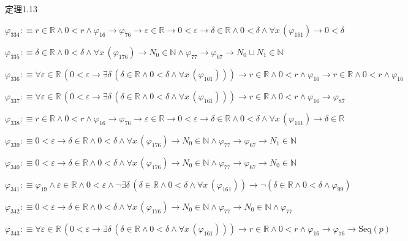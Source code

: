 \begin{fullproof}{定理1.13}
\begin{abbrevlist}
\item $\varphi_{334} :\equiv r \in \mathbb{R} \land 0 < r \land \varphi_{16} \to \varphi_{76} \to \varepsilon \in \mathbb{R} \to 0 < \varepsilon \to \delta \in \mathbb{R} \land 0 < \delta \land \forall x\,(\varphi_{161}) \to 0 < \delta$
\item $\varphi_{335} :\equiv \delta \in \mathbb{R} \land 0 < \delta \land \forall x\,(\varphi_{176}) \to N_{0} \in \mathbb{N} \land \varphi_{77} \to \varphi_{67} \to N_{0} \cup N_{1} \in \mathbb{N}$
\item $\varphi_{336} :\equiv \forall \varepsilon \in \mathbb{R}\,(0 < \varepsilon \to \exists \delta\,(\delta \in \mathbb{R} \land 0 < \delta \land \forall x\,(\varphi_{161}))) \to r \in \mathbb{R} \land 0 < r \land \varphi_{16} \to r \in \mathbb{R} \land 0 < r \land \varphi_{16}$
\item $\varphi_{337} :\equiv \forall \varepsilon \in \mathbb{R}\,(0 < \varepsilon \to \exists \delta\,(\delta \in \mathbb{R} \land 0 < \delta \land \forall x\,(\varphi_{161}))) \to r \in \mathbb{R} \land 0 < r \land \varphi_{16} \to \varphi_{87}$
\item $\varphi_{338} :\equiv r \in \mathbb{R} \land 0 < r \land \varphi_{16} \to \varphi_{76} \to \varepsilon \in \mathbb{R} \to 0 < \varepsilon \to \delta \in \mathbb{R} \land 0 < \delta \land \forall x\,(\varphi_{161}) \to \delta \in \mathbb{R}$
\item $\varphi_{339} :\equiv 0 < \varepsilon \to \delta \in \mathbb{R} \land 0 < \delta \land \forall x\,(\varphi_{176}) \to N_{0} \in \mathbb{N} \land \varphi_{77} \to \varphi_{67} \to N_{1} \in \mathbb{N}$
\item $\varphi_{340} :\equiv 0 < \varepsilon \to \delta \in \mathbb{R} \land 0 < \delta \land \forall x\,(\varphi_{176}) \to N_{0} \in \mathbb{N} \land \varphi_{77} \to \varphi_{67} \to N_{0} \in \mathbb{N}$
\item $\varphi_{341} :\equiv \varphi_{19} \land \varepsilon \in \mathbb{R} \land 0 < \varepsilon \land \neg \exists \delta\,(\delta \in \mathbb{R} \land 0 < \delta \land \forall x\,(\varphi_{161})) \to \neg (\delta \in \mathbb{R} \land 0 < \delta \land \varphi_{99})$
\item $\varphi_{342} :\equiv 0 < \varepsilon \to \delta \in \mathbb{R} \land 0 < \delta \land \forall x\,(\varphi_{176}) \to N_{0} \in \mathbb{N} \land \varphi_{77} \to N_{0} \in \mathbb{N} \land \varphi_{77}$
\item $\varphi_{343} :\equiv \forall \varepsilon \in \mathbb{R}\,(0 < \varepsilon \to \exists \delta\,(\delta \in \mathbb{R} \land 0 < \delta \land \forall x\,(\varphi_{161}))) \to r \in \mathbb{R} \land 0 < r \land \varphi_{16} \to \varphi_{76} \to \mathrm{Seq}(p)$

\end{abbrevlist}
\end{fullproof}

